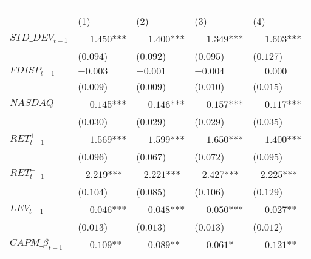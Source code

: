 \begin{table}
\begin{tabular}[t]{>{\raggedright\arraybackslash}p{3.1cm}>{\raggedright\arraybackslash}p{2.6cm}>{\raggedright\arraybackslash}p{2.6cm}>{\raggedright\arraybackslash}p{2.6cm}>{\raggedright\arraybackslash}p{2.6cm}}
\multicolumn{1}{c}{ } & \multicolumn{4}{c}{$L\_TURN_t$} \\
\cmidrule(l{3pt}r{3pt}){2-5}
\multicolumn{1}{c}{\bgroup\fontsize{9}{11}\selectfont \em{ }\egroup{}} & \multicolumn{1}{c}{\bgroup\fontsize{9}{11}\selectfont \em{$s = 0$}\egroup{}} & \multicolumn{1}{c}{\bgroup\fontsize{9}{11}\selectfont \em{$s = 1$}\egroup{}} & \multicolumn{1}{c}{\bgroup\fontsize{9}{11}\selectfont \em{$s = 2$}\egroup{}} & \multicolumn{1}{c}{\bgroup\fontsize{9}{11}\selectfont \em{$s \geq 3$}\egroup{}} \\
\cmidrule(l{3pt}r{3pt}){2-2} \cmidrule(l{3pt}r{3pt}){3-3} \cmidrule(l{3pt}r{3pt}){4-4} \cmidrule(l{3pt}r{3pt}){5-5}
 & \phantom{-}(1) & \phantom{-}(2) & \phantom{-}(3) & \phantom{-}(4)\\
\midrule
$STD\_DEV_{t-1}$ & $\phantom{-}1.450$*** & $\phantom{-}1.400$*** & $\phantom{-}1.349$*** & $\phantom{-}1.603$***\\
 & (\phantom{-}$0.094$) & (\phantom{-}$0.092$) & (\phantom{-}$0.095$) & (\phantom{-}$0.127$)\\
\addlinespace
$FDISP_{t-1}$ & $-0.003$ & $-0.001$ & $-0.004$ & $\phantom{-}0.000$\\
 & (\phantom{-}$0.009$) & (\phantom{-}$0.009$) & (\phantom{-}$0.010$) & (\phantom{-}$0.015$)\\
\addlinespace
$NASDAQ$ & $\phantom{-}0.145$*** & $\phantom{-}0.146$*** & $\phantom{-}0.157$*** & $\phantom{-}0.117$***\\
 & (\phantom{-}$0.030$) & (\phantom{-}$0.029$) & (\phantom{-}$0.029$) & (\phantom{-}$0.035$)\\
\addlinespace
$RET^+_{t-1}$ & $\phantom{-}1.569$*** & $\phantom{-}1.599$*** & $\phantom{-}1.650$*** & $\phantom{-}1.400$***\\
 & (\phantom{-}$0.096$) & (\phantom{-}$0.067$) & (\phantom{-}$0.072$) & (\phantom{-}$0.095$)\\
\addlinespace
$RET^-_{t-1}$ & $-2.219$*** & $-2.221$*** & $-2.427$*** & $-2.225$***\\
 & (\phantom{-}$0.104$) & (\phantom{-}$0.085$) & (\phantom{-}$0.106$) & (\phantom{-}$0.129$)\\
\addlinespace
$LEV_{t-1}$ & $\phantom{-}0.046$*** & $\phantom{-}0.048$*** & $\phantom{-}0.050$*** & $\phantom{-}0.027$**\\
 & (\phantom{-}$0.013$) & (\phantom{-}$0.013$) & (\phantom{-}$0.013$) & (\phantom{-}$0.012$)\\
\addlinespace
$CAPM\_\beta_{t-1}$ & $\phantom{-}0.109$** & $\phantom{-}0.089$** & $\phantom{-}0.061$* & $\phantom{-}0.121$**\\

\end{tabular}
\end{table}
